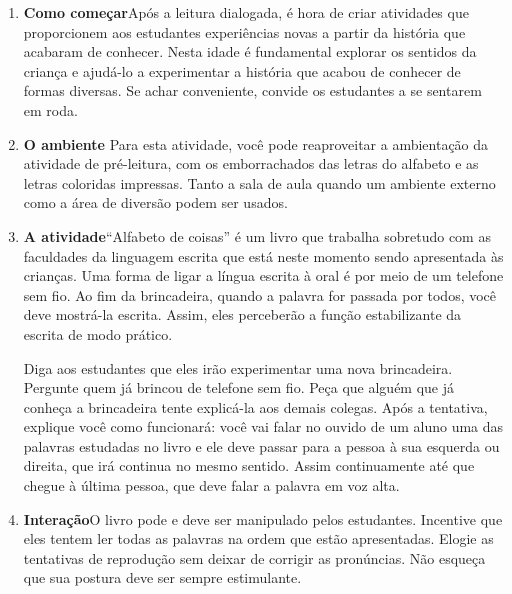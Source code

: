 \documentclass[11pt]{extarticle}
\begin{document}
\begin{enumerate}
\item \textbf{Como começar}\quad Após a leitura dialogada, é hora de criar 
atividades que proporcionem aos estudantes experiências novas a partir da história 
que acabaram de conhecer. Nesta idade é fundamental explorar os sentidos da criança e 
ajudá-lo a experimentar a história que acabou de conhecer de formas diversas. Se achar 
conveniente, convide os estudantes a se sentarem em roda. 

\item \textbf{O ambiente}\quad  
Para esta atividade, você pode reaproveitar a ambientação da 
atividade de pré-leitura, com os emborrachados das letras
do alfabeto e as letras coloridas impressas. Tanto a sala
de aula quando um ambiente externo como a área de diversão
podem ser usados. 

\item \textbf{A atividade}\quad “Alfabeto de coisas” é um livro
que trabalha sobretudo com as faculdades da linguagem escrita que
está neste momento sendo apresentada às crianças. Uma forma de 
ligar a língua escrita à oral é por meio de um telefone sem fio.
Ao fim da brincadeira, quando a palavra for passada por todos,
você deve mostrá-la escrita. Assim, eles perceberão 
a função estabilizante da escrita de modo prático.

Diga aos estudantes que eles irão experimentar uma nova brincadeira.
Pergunte quem já brincou de telefone sem fio. Peça que alguém que já
conheça a brincadeira tente explicá-la aos demais colegas.
Após a tentativa, explique você como funcionará: você vai falar
no ouvido de um aluno uma das palavras estudadas no livro
e ele deve passar para a pessoa à sua esquerda ou direita, 
que irá continua no mesmo sentido. Assim continuamente até que chegue à última
pessoa, que deve falar a palavra em voz alta. 


\item \textbf{Interação}\quad O livro pode e deve ser 
manipulado pelos estudantes. Incentive que eles tentem ler
todas as palavras na ordem que estão apresentadas. 
Elogie as tentativas de reprodução sem deixar de 
corrigir as pronúncias. Não esqueça que sua postura deve
ser sempre estimulante. 
\end{enumerate}
\end{document}
